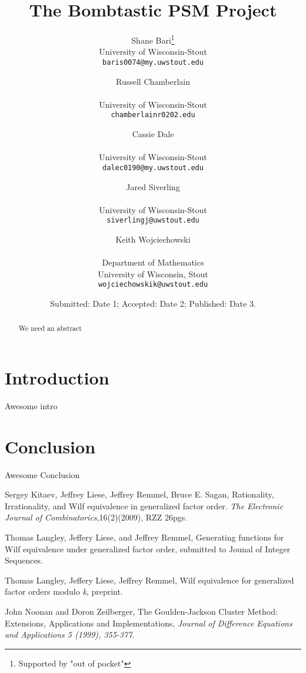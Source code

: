 \documentclass[11pt]{article}
\title{The Bombtastic PSM Project}
\author{
Shane Bari\footnote{Supported by "out of pocket"}\\
\small University of Wisconsin-Stout\\[-0.8ex]
\small \texttt{baris0074@my.uwstout.edu}
\and
Russell Chamberlain\addtocounter{footnote}{0}\footnotemark[\value{footnote}]\\
\small University of Wisconsin-Stout\\[-0.8ex]
\small \texttt{chamberlainr0202.edu}
\and
Cassie Dale\addtocounter{footnote}{0}\footnotemark[\value{footnote}]\\
\small University of Wisconsin-Stout\\[-0.8ex]
\small \texttt{dalec0190@my.uwstout.edu}
\and
Jared Siverling\addtocounter{footnote}{0}\footnotemark[\value{footnote}]\\
\small University of Wisconsin-Stout\\[-0.8ex]
\small \texttt{siverlingj@uwstout.edu}
\and
Keith Wojciechowski\addtocounter{footnote}{0}\footnotemark[\value{footnote}]\\
\small Department of Mathematics\\[-0.8ex]
\small University of Wisconsin, Stout\\[-0.8ex]
\small \texttt{wojciechowskik@uwstout.edu}
}
\date{\small Submitted: Date 1;  Accepted: Date 2;
 Published: Date 3.}
\begin{document}
\maketitle
\begin{abstract}
We need an abstract
\end{abstract}

\section{Introduction}\label{intro}
Awesome intro

\section{Conclusion}\label{conclu}
Awesome Conclusion

\begin{thebibliography}{20}

 Sergey Kitaev, Jeffrey Liese, Jeffrey Remmel, Bruce E. Sagan, Rationality, Irrationality, and Wilf equivalence in generalized factor order. \emph{The Electronic Journal of Combinatorics},16(2)(2009), RZZ 26pgs.

 Thomas Langley, Jeffery Liese, and Jeffrey Remmel, Generating functions for Wilf equivalence under generalized factor order, submitted to Jounal of Integer Sequences.

 Thomas Langley, Jeffery Liese, Jeffrey Remmel, Wilf equivalence for generalized factor orders modulo \emph{k}, preprint.

 John Noonan and Doron Zeilberger, The Goulden-Jackson Cluster Method: Extensions, Applications and Implementations,\emph{ Journal of Difference Equations and Applications 5 (1999), 355-377}.

\end{thebibliography}
\end{document}
